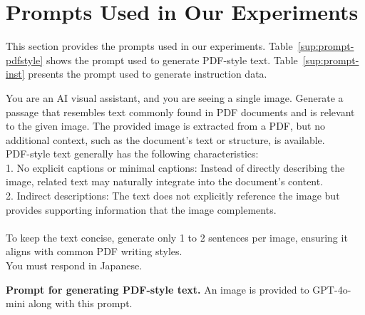 \section{Prompts Used in Our Experiments}\label{supsec:prompt}
This section provides the prompts used in our experiments.
Table~\ref{sup:prompt-pdfstyle} shows the prompt used to generate PDF-style text.
Table~\ref{sup:prompt-inst} presents the prompt used to generate instruction data.

\begin{table*}[t]
\begin{tcolorbox}[colback=gray!10, colframe=black, rounded corners]
You are an AI visual assistant, and you are seeing a single image. Generate a passage that resembles text commonly found in PDF documents and is relevant to the given image. The provided image is extracted from a PDF, but no additional context, such as the document’s text or structure, is available.\\
PDF-style text generally has the following characteristics:\\
1. No explicit captions or minimal captions: Instead of directly describing the image, related text may naturally integrate into the document’s content.\\
2. Indirect descriptions: The text does not explicitly reference the image but provides supporting information that the image complements.
\\\\
To keep the text concise, generate only 1 to 2 sentences per image, ensuring it aligns with common PDF writing styles. \\
You must respond in Japanese.
\end{tcolorbox}
\vspace{-4mm}
\caption{\textbf{Prompt for generating PDF-style text.} 
An image is provided to GPT-4o-mini along with this prompt.}
\label{sup:prompt-pdfstyle}
\end{table*}


